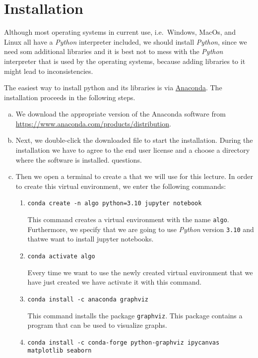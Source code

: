 \section{Installation}
Although most operating systems in current use, i.e.~Windows, MacOs, and Linux all have a \textsl{Python}
interpreter included, we should install \textsl{Python}, since we need som additional libraries and it is best
not to mess with the \textsl{Python} interpreter that is used by the operating systems, because adding
libraries to it might lead to inconsistencies.

The easiest way to install python and its libraries is via \href{https://www.anaconda.com/download/}{Anaconda}.
The installation proceeds in the following steps.
\begin{enumerate}[(a)]
\item We download the appropriate version of the Anaconda software from
      \\[0.2cm]
      \hspace*{1.3cm}
      \href{https://www.anaconda.com/products/distribution}{https://www.anaconda.com/products/distribution}.
\item Next, we double-click the downloaded file to start the installation.  During the installation we have to
      agree to the end user license and a choose a directory where the software is installed.
      questions.  
\item Then we open a terminal to create a  that we will use for this lecture.
      In order to create this virtual environment, we enter the following commands:
      \begin{enumerate}
      \item \texttt{conda create -n algo python=3.10 jupyter notebook}

            This command creates a virtual environment with the name \texttt{algo}.  Furthermore, we specify
            that we are going to use \textsl{Python} version \texttt{3.10} and thatwe want to install
            jupyter notebooks.
      \item \texttt{conda activate algo}

            Every time we want to use the newly created virtual environment that we have just created we have
            activate it with this command.
      \item \texttt{conda install -c anaconda graphviz}

            This command installs the package \texttt{graphviz}.  This package contains a program that
            can be used to visualize graphs.
      \item \texttt{conda install -c conda-forge python-graphviz ipycanvas matplotlib seaborn}


\end{enumerate}
\end{enumerate}

